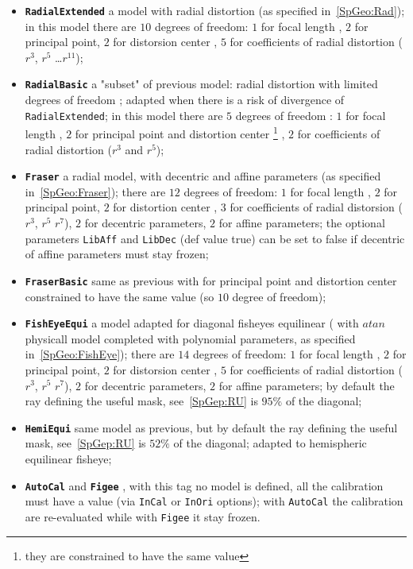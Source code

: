 \begin{itemize}

   \item {\tt \bf RadialExtended} a model with radial distortion
	 (as specified in~\ref{SpGeo:Rad});
	 in this model there are $10$ degrees of freedom:
	 $1$ for focal length  , $2$ for principal point, $2$ for distorsion center ,
	 $5$ for coefficients of radial distortion ($r^3$, $r^5$ \dots $r^{11}$);

   \item {\tt \bf RadialBasic}  a "subset" of previous model:
	  radial distortion with limited degrees of freedom ;
	 adapted when there is a risk of divergence of {\tt RadialExtended};
	 in this model there are $5$ degrees of freedom :  $1$ for focal length  ,
	 $2$ for principal point and distortion center \footnote{they are constrained to have
	 the same value} ,
	 $2$ for coefficients of radial distortion ($r^3$ and  $r^5$);



   \item {\tt \bf Fraser}  a radial model, with decentric and affine parameters
	  (as specified in~\ref{SpGeo:Fraser}); there are $12$ degrees of freedom:
	 $1$ for focal length  , $2$ for principal point, $2$ for distortion center ,
	 $3$ for coefficients of radial distorsion ($r^3$, $r^5$  $r^7$),
	 $2$ for decentric parameters, $2$ for affine parameters;
	 the optional parameters {\tt LibAff} and {\tt LibDec} (def value true) can
	 be set to false if decentric of affine parameters must stay frozen;


   \item {\tt \bf FraserBasic}  same as previous with for principal point and distortion center
	 constrained to have the same value (so $10$ degree of freedom);

   \item {\tt \bf FishEyeEqui}  a model adapted for diagonal fisheyes equilinear
	 ( with $atan$ physicall model completed with polynomial parameters,
	  as specified in~\ref{SpGeo:FishEye}); there are $14$ degrees of freedom:
	 $1$ for focal length  , $2$ for principal point, $2$ for distorsion center ,
	 $5$ for coefficients of radial distortion ($r^3$, $r^5$  $r^7$),
	 $2$ for decentric parameters, $2$ for affine parameters;
	 by default the ray defining the useful mask, see~\ref{SpGep:RU}
	 is $95\%$ of the diagonal;


   \item {\tt \bf HemiEqui}  same model as previous, but  by default the ray defining
	 the useful mask, see~\ref{SpGep:RU} is $52\%$ of the diagonal; adapted
	 to hemispheric equilinear fisheye;


   \item {\tt \bf AutoCal} and {\tt \bf Figee} , with this tag no model is defined,
	 all the calibration must have a value (via {\tt InCal} or {\tt InOri} options);
	 with {\tt  AutoCal} the calibration are re-evaluated while with {\tt  Figee}
	 it stay frozen.

\end{itemize}


